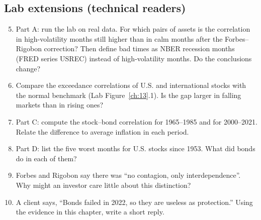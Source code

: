 \subsection*{Lab extensions (technical readers)}

\begin{enumerate}
  \setcounter{enumi}{4}
  \item Part A: run the lab on real data. For which pairs of assets is the correlation in high-volatility months still higher than in calm months after the Forbes--Rigobon correction? Then define bad times as NBER recession months (FRED series USREC) instead of high-volatility months. Do the conclusions change?
  \item Compare the exceedance correlations of U.S. and international stocks with the normal benchmark (Lab Figure~\ref{ch:13}.1). Is the gap larger in falling markets than in rising ones?
  \item Part C: compute the stock--bond correlation for 1965--1985 and for 2000--2021. Relate the difference to average inflation in each period.
  \item Part D: list the five worst months for U.S. stocks since 1953. What did bonds do in each of them?
  \item Forbes and Rigobon say there was ``no contagion, only interdependence''. Why might an investor care little about this distinction?
  \item A client says, ``Bonds failed in 2022, so they are useless as protection.'' Using the evidence in this chapter, write a short reply.
\end{enumerate}
